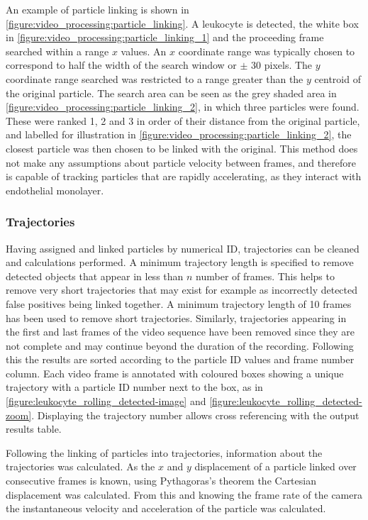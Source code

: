 An example of particle linking is shown in \autoref{figure:video_processing:particle_linking}. A leukocyte is detected, the white box in \autoref{figure:video_processing:particle_linking_1} and the proceeding frame searched within a range $x$ values. An $x$ coordinate range was typically chosen to correspond to half the width of the search window or $\pm$ 30 pixels. The $y$ coordinate range searched was restricted to a range greater than the $y$ centroid of the original particle. The search area can be seen as the grey shaded area in \autoref{figure:video_processing:particle_linking_2}, in which three particles were found. These were ranked 1, 2 and 3 in order of their distance from the original particle, and labelled for illustration in \autoref{figure:video_processing:particle_linking_2}, the closest particle was then chosen to be linked with the original. This method does not make any assumptions about particle velocity between frames, and therefore is capable of tracking particles that are rapidly accelerating, as they interact with endothelial monolayer.

\subsubsection{Trajectories}
Having assigned and linked particles by numerical ID, trajectories can be cleaned and calculations performed. A minimum trajectory length is specified to remove detected objects that appear in less than $n$ number of frames. This helps to remove very short trajectories that may exist for example as incorrectly detected false positives being linked together. A minimum trajectory length of 10 frames has been used to remove short trajectories. Similarly, trajectories appearing in the first and last frames of the video sequence have been removed since they are not complete and may continue beyond the duration of the recording. Following this the results are sorted according to the particle ID values and frame number column. Each video frame is annotated with coloured boxes showing a unique trajectory with a particle ID number next to the box, as in \autoref{figure:leukocyte_rolling_detected-image} and \autoref{figure:leukocyte_rolling_detected-zoom}. Displaying the trajectory number allows cross referencing with the output results table.

Following the linking of particles into trajectories, information about the trajectories was calculated. As the $x$ and $y$ displacement of a particle linked over consecutive frames is known, using Pythagoras's theorem the Cartesian displacement was calculated. From this and knowing the frame rate of the camera the instantaneous velocity and acceleration of the particle was calculated.

